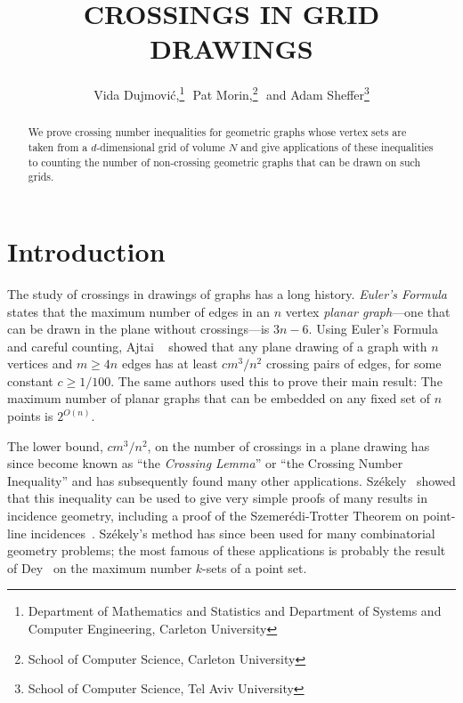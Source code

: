\documentclass{patmorin}
\title{\MakeUppercase{Crossings in Grid Drawings}}
\author{%
  Vida Dujmovi\'c,\thanks{Department of Mathematics and Statistics
       and Department of Systems and Computer Engineering, 
       Carleton University}\,\, 
  Pat Morin,\thanks{School of Computer Science, Carleton University}\,\, and 
  Adam Sheffer\thanks{School of Computer Science, Tel Aviv University}}
\newcommand{\n}{N}
\begin{document}
\begin{titlepage}
\maketitle

\begin{abstract}
   We prove crossing number inequalities for geometric graphs whose
   vertex sets are taken from a $d$-dimensional grid of volume $\n$
   and give applications of these inequalities to counting the number
   of non-crossing geometric graphs that can be drawn on such grids.
\end{abstract}

\end{titlepage}


\section{Introduction}

The study of crossings in drawings of graphs has a long history.
\emph{Euler's Formula} states that the maximum number of edges in an $n$
vertex \emph{planar graph}---one that can be drawn in the plane without
crossings---is $3n-6$.  Using Euler's Formula and careful counting, Ajtai
\etal~\cite{ajtai.chvatal.ea:crossing-free} showed that any plane drawing
of a graph with $n$ vertices and $m\ge 4n$ edges has at least $c m^3/n^2$
crossing pairs of edges, for some constant $c\ge 1/100$.  The same authors
used this to prove their main result: The maximum number of planar graphs
that can be embedded on any fixed set of $n$ points is $2^{O(n)}$.

The lower bound, $cm^3/n^2$, on the number of crossings in a plane
drawing has since become known as ``the \emph{Crossing Lemma}''
or ``the Crossing Number Inequality'' and has subsequently found many
other applications.  Sz\'ekely~\cite{szekely:crossing} showed that
this inequality can be used to give very simple proofs of many results
in incidence geometry, including a proof of the Szemer\'edi-Trotter
Theorem on point-line incidences~\cite{szemeredi.trotter:extremal}.
Sz\'ekely's method has since been used for many combinatorial geometry
problems; the most famous of these applications is probably the result
of Dey~\cite{dey:improved} on the maximum number $k$-sets of a point set.
\end{document}
